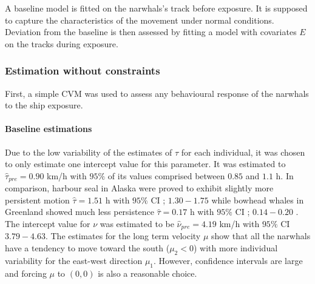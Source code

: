 \documentclass[11pt]{article}
\newcommand {\1}{\mathbb{1}}
\begin{document}
A baseline model is fitted on the narwhals's track before exposure. It is supposed to capture the characteristics of the movement under normal conditions. Deviation from the baseline is then assessed by fitting a model with covariates $E$ on the tracks during exposure.

\subsubsection{Estimation without constraints}

First, a simple CVM was used to assess any behavioural response of the narwhals to the ship exposure.

\paragraph{Baseline estimations}
Due to the low variability of the estimates of $\tau$ for each individual, it was chosen to only estimate one intercept value for this parameter. It was estimated to $\hat{\tau}_{pre}=0.90 $ km/h with $95 \%$ of its values comprised between $0.85$ and $1.1$ h.
In comparison, harbour seal in Alaska were proved to exhibit slightly more persistent motion $\hat{\tau}=1.51$ h with $95\%$ CI ; $1.30 -1.75$  \cite{johnson_continuous_2008} while bowhead whales in Greenland showed much less persistence $\hat{\tau}=0.17$ h with $95\%$ CI ; $0.14 -0.20$  \cite{gurarie_correlated_2017}.
The intercept value for $\nu$ was estimated to be $\hat{\nu}_{pre}=4.19$ km/h with $95\%$ CI $3.79-4.63$.
The estimates for the long term velocity $\mu$ show that all the narwhals have a tendency to move toward the south ($\mu_2<0$) with more individual variability for the east-west direction $\mu_1$. However, confidence intervals are large and  forcing $\mu$ to $(0,0)$ is also a reasonable choice.
\end{document}

